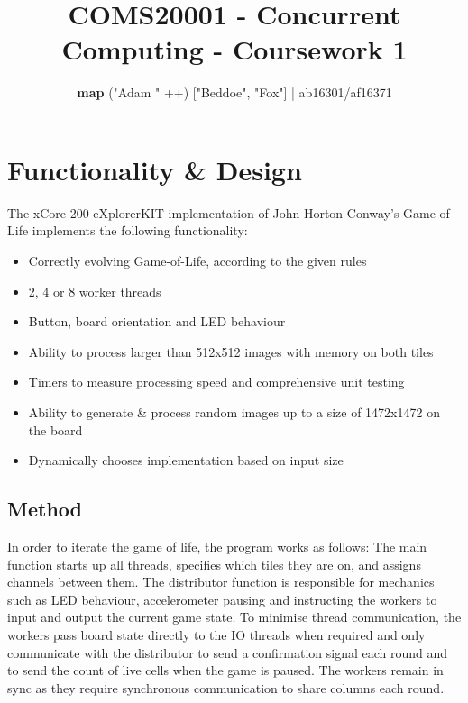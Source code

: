 \documentclass[11pt, oneside]{article}
\title{COMS20001 - Concurrent Computing - Coursework 1}
\author{\textbf{map} ("Adam " ++) ["Beddoe", "Fox"]   |  ab16301/af16371 }
\date{\vspace{-5mm}}
\begin{document}
\maketitle

\section{Functionality \& Design}
The xCore-200 eXplorerKIT implementation of John Horton Conway's Game-of-Life implements the following functionality:

\begin{itemize}
\setlength\itemsep{-2mm}
	\item Correctly evolving Game-of-Life, according to the given rules
	\item 2, 4 or 8 worker threads
	\item Button, board orientation and LED behaviour
	\item Ability to process larger than 512x512 images with memory on both tiles
	\item Timers to measure processing speed and comprehensive unit testing
	\item Ability to generate \& process random images up to a size of 1472x1472 on the board
        \item Dynamically chooses implementation based on input size
\end{itemize}

\vspace{-4mm}
\subsection{Method}
\vspace{-2mm}
In order to iterate the game of life, the program works as follows: The main function starts up all threads, specifies which tiles they are on, and assigns channels between them. The distributor function is responsible for mechanics such as LED behaviour, accelerometer pausing and instructing the workers to input and output the current game state. To minimise thread communication, the workers pass board state directly to the IO threads when required and only communicate with the distributor to send a confirmation signal each round and to send the count of live cells when the game is paused. The workers remain in sync as they require synchronous communication to share columns each round.


\vspace{-4mm}
\end{document}
